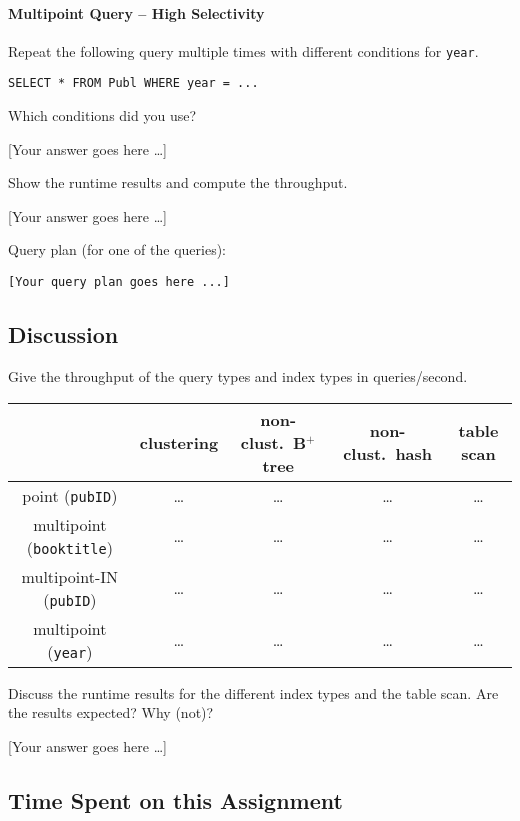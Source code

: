 \documentclass[11pt]{scrartcl}
\newcommand{\youranswerhere}{[Your answer goes here \ldots]}
\begin{document}
\paragraph{Multipoint Query -- High Selectivity}

Repeat the following query multiple times with different conditions for \texttt{year}.

\begin{lstlisting}[style=dbtsql]
SELECT * FROM Publ WHERE year = ...
\end{lstlisting}

Which conditions did you use?

\youranswerhere{}

Show the runtime results and compute the throughput.

\youranswerhere{}

Query plan (for one of the queries):

{\small
\parskip0pt\begin{verbatim}
[Your query plan goes here ...]
\end{verbatim}}

\subsection*{Discussion}

Give the throughput of the query types and index types in queries/second.
\begin{table}[H]
  \centering
  \begin{tabular}{c|c|c|c|c}
    & clustering & non-clust.\ B$^+$ tree & non-clust.\ hash & table scan
      \tabularnewline
    \hline
    point (\texttt{pubID}) & \ldots & \ldots & \ldots & \ldots \tabularnewline
    \hline
    multipoint (\texttt{booktitle}) & \ldots & \ldots & \ldots & \ldots
      \tabularnewline
    \hline
		multipoint-IN (\texttt{pubID}) & \ldots & \ldots & \ldots & \ldots
      \tabularnewline
		\hline
    multipoint (\texttt{year}) & \ldots & \ldots & \ldots & \ldots
      \tabularnewline
  \end{tabular}
\end{table}

Discuss the runtime results for the different index types and the table scan. Are the results expected? Why (not)?

\youranswerhere{}

\subsection*{Time Spent on this Assignment}
\end{document}
